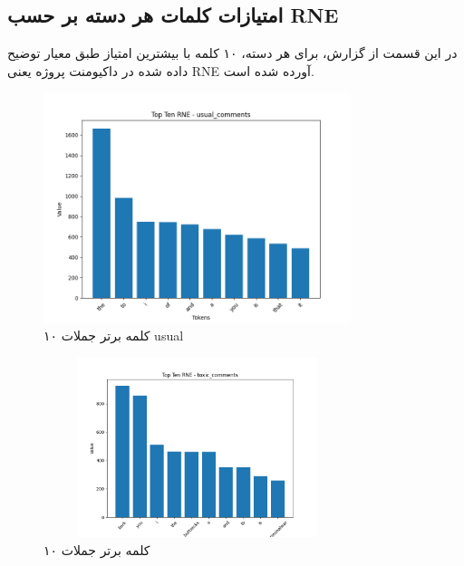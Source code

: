 \clearpage

\subsection{امتیازات کلمات هر دسته بر حسب RNE}
در این قسمت از گزارش، برای هر دسته، ۱۰ کلمه با بیشترین امتیاز طبق معیار توضیح داده شده در داکیومنت پروژه یعنی RNE آورده شده است.

\begin{figure}[htbp]
  \centering
  \includegraphics[width=0.8\textwidth]{stats/top_ten_RNE_usual_comments.png}
  \caption{۱۰ کلمه برتر جملات usual}
  \label{fig:unique_common_words_total}
\end{figure}

\begin{figure}[htbp]
  \centering
  \includegraphics[width=0.8\textwidth, height=5.25cm]{stats/top_ten_RNE_toxic_comments.png}
  \caption{۱۰ کلمه برتر جملات }
  \label{fig:unique_uncommon_words_count}
\end{figure}


